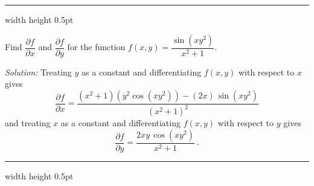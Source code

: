 \vspace{3mm}
\hrule width \textwidth height 0.5pt
\begin{exmp}
 Find $\dfrac{\partial f}{\partial x}$ and $\dfrac{\partial f}{\partial y}$ for the function
 $f(x,y) = \dfrac{\sin (xy^2)}{x^2 + 1}$.\vspace{1mm}
 \par\noindent\emph{Solution:} Treating $y$ as a constant and differentiating $f(x,y)$ with respect to $x$ gives
 \begin{displaymath}
  \dfrac{\partial f}{\partial x} = \dfrac{(x^2 + 1)(y^2 \cos (xy^2)) - (2x)\,\sin (xy^2)}{(x^2 + 1)^2}
 \end{displaymath}
 and treating $x$ as a constant and differentiating $f(x,y)$ with respect to $y$ gives
 \begin{displaymath}
  \dfrac{\partial f}{\partial y} = \dfrac{2xy\,\cos (xy^2)}{x^2 + 1} ~.
 \end{displaymath}
\end{exmp}
\hrule width \textwidth height 0.5pt
\vspace{3mm}

